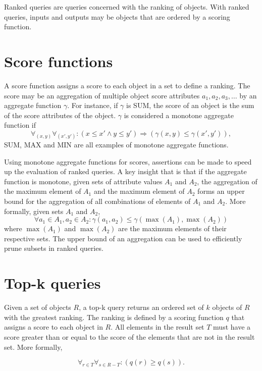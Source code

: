Ranked queries are queries concerned with the ranking of objects. With ranked queries, inputs and outputs may be objects that are ordered by a scoring function.

\section{Score functions}

A score function assigns a score to each object in a set to define a ranking. The score may be an aggregation of multiple object score attributes \(a_1, a_2, a_3, \dotsc\) by an aggregate function \(\gamma\). For instance, if \(\gamma\) is SUM, the score of an object is the sum of the score attributes of the object. \(\gamma\) is considered a monotone aggregate function if
\[
  \forall_{(x, y)} \forall_{(x', y')} :
  \left(
  x \leq x'
  \land
  y \leq y'
  \right)
  \Rightarrow
  \left(
  \gamma(x, y) \leq \gamma(x', y')
  \right),
\]
SUM, MAX and MIN are all examples of monotone aggregate functions.

Using monotone aggregate functions for scores, assertions can be made to speed up the evaluation of ranked queries. A key insight that is that if the aggregate function is monotone, given sets of attribute values \(A_1\) and \(A_2\), the aggregation of the maximum element of \(A_1\) and the maximum element of \(A_2\) forms an upper bound for the aggregation of all combinations of elements of \(A_1\) and \(A_2\). More formally, given sets \(A_1\) and \(A_2\),
\[
  \forall a_1 \in A_1, a_2 \in A_2 :
  \gamma(a_1, a_2)
  \leq
  \gamma(\max(A_1), \max(A_2))
\]
where \(\max(A_1)\) and \(\max(A_2)\) are the maximum elements of their respective sets. The upper bound of an aggregation can be used to efficiently prune subsets in ranked queries.

\section{Top-k queries}

Given a set of objects \(R\), a top-k query returns an ordered set of \(k\) objects of \(R\) with the greatest ranking. The ranking is defined by a scoring function \(q\) that assigns a score to each object in \(R\). All elements in the result set \(T\) must have a score greater than or equal to the score of the elements that are not in the result set. More formally,

\[
  \forall_{r \in T}
  \forall_{s \in R - T} :
  \left(q(r) \geq q(s) \right).
\]

